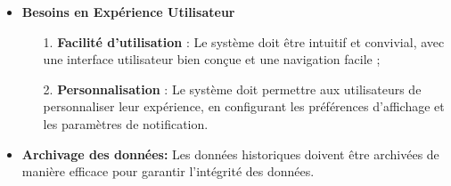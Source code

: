 \begin{itemize}
        \item\textbf{Besoins en Expérience Utilisateur}
    
                \begin{enumerate}
                    \item[1.] \textbf{Facilité d'utilisation} : Le système doit être intuitif et convivial, avec une interface utilisateur bien conçue et une navigation facile ;
                    
                    \item[2.] \textbf{Personnalisation} : Le système doit permettre aux utilisateurs de personnaliser leur expérience, en configurant les préférences d'affichage et les paramètres de notification.
                \end{enumerate}
        \item \textbf{Archivage des données: }Les données historiques doivent être archivées de manière efficace pour garantir l'intégrité des données.
  \end{itemize}
